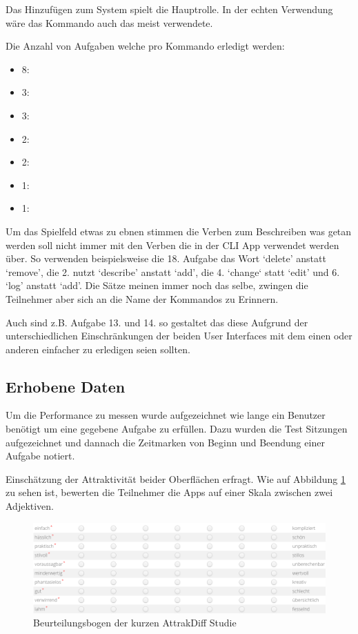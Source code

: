 \documentclass[oneside,bibliography=totocnumbered,BCOR=5mm]{scrbook}
\begin{document}
Das Hinzufügen zum System spielt die Hauptrolle. In der echten Verwendung wäre
das  Kommando auch das meist verwendete.

Die Anzahl von Aufgaben welche pro Kommando erledigt werden:
\begin{itemize}
  \item 8: 
  \item 3: 
  \item 3: 
  \item 2: 
  \item 2: 
  \item 1: 
  \item 1: 
\end{itemize}

Um das Spielfeld etwas zu ebnen stimmen die Verben zum Beschreiben was getan
werden soll nicht immer mit den Verben die in der CLI App verwendet werden über.
So verwenden beispielsweise die 18. Aufgabe das Wort `delete' anstatt `remove',
die 2. nutzt `describe' anstatt `add', die 4. `change` statt `edit' und 6. `log'
anstatt `add'. Die Sätze meinen immer noch das selbe, zwingen die Teilnehmer
aber sich an die Name der Kommandos zu Erinnern.

Auch sind z.B. Aufgabe 13. und 14. so gestaltet das diese Aufgrund der unterschiedlichen
Einschränkungen der beiden User Interfaces mit dem einen oder anderen einfacher
zu erledigen seien sollten.

\subsection{Erhobene Daten}

Um die Performance zu messen wurde aufgezeichnet wie lange ein Benutzer
benötigt um eine gegebene Aufgabe zu erfüllen. Dazu wurden die Test Sitzungen
aufgezeichnet und dannach die Zeitmarken von Beginn und Beendung einer Aufgabe
notiert.

Einschätzung der Attraktivität beider Oberflächen erfragt. Wie auf Abbildung
\ref{fig:survey-values} zu sehen ist, bewerten die Teilnehmer die Apps auf einer
Skala zwischen zwei Adjektiven.

\begin{figure}
  \centering
  \includegraphics[scale=0.5]{survey-values.png}
  \caption{Beurteilungsbogen der kurzen AttrakDiff Studie}
  \label{fig:survey-values}
\end{figure}
\end{document}
